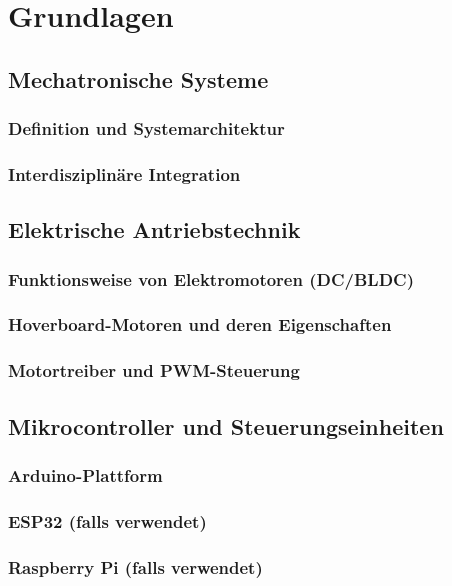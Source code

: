 \chapter{Grundlagen}
\label{cha:Grundlagen}


\section{Mechatronische Systeme}
\subsection{Definition und Systemarchitektur}
\subsection{Interdisziplinäre Integration}

\section{Elektrische Antriebstechnik}
\subsection{Funktionsweise von Elektromotoren (DC/BLDC)}
\subsection{Hoverboard-Motoren und deren Eigenschaften}
\subsection{Motortreiber und PWM-Steuerung}

\section{Mikrocontroller und Steuerungseinheiten}
\subsection{Arduino-Plattform}
\subsection{ESP32 (falls verwendet)}
\subsection{Raspberry Pi (falls verwendet)}

